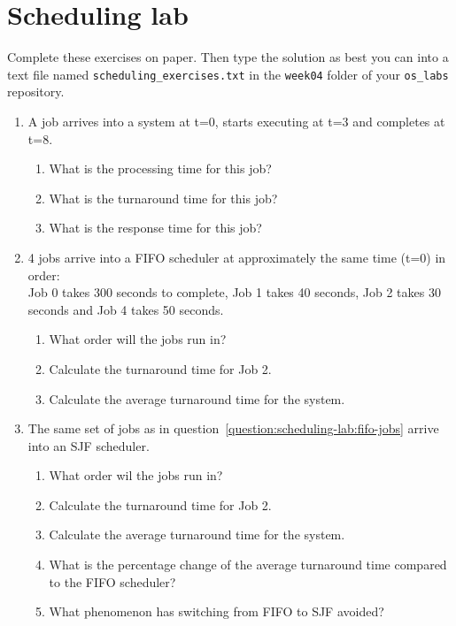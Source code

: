 \chapter{Scheduling lab}
\label{ch:scheduling-lab}

Complete these exercises on paper.
Then type the solution as best you can into a text file named \texttt{scheduling\_exercises.txt} in the \texttt{week04} folder of your \texttt{os\_labs} repository.

\begin{enumerate}

\item 
  A job arrives into a system at t=0, starts executing at t=3 and completes at t=8.
  \begin{enumerate}
  \item What is the processing time for this job?
  \item What is the turnaround time for this job?
  \item What is the response time for this job?
  \end{enumerate}

\item \label{question:scheduling-lab:fifo-jobs}
  4 jobs arrive into a FIFO scheduler at approximately the same time (t=0) in order:\\
  Job 0 takes 300 seconds to complete, Job 1 takes 40 seconds, Job 2 takes 30 seconds and Job 4 takes 50 seconds.
  \begin{enumerate}
  \item What order will the jobs run in?
  \item Calculate the turnaround time for Job 2.
  \item Calculate the average turnaround time for the system.
  \end{enumerate}
  
\item
  The same set of jobs as in question~\ref{question:scheduling-lab:fifo-jobs} arrive into an SJF scheduler.
  \begin{enumerate}
  \item What order wil the jobs run in?
  \item Calculate the turnaround time for Job 2.
  \item Calculate the average turnaround time for the system.
  \item What is the percentage change of the average turnaround time compared to the FIFO scheduler?
  \item What phenomenon has switching from FIFO to SJF avoided?
  \end{enumerate}


\end{enumerate}
